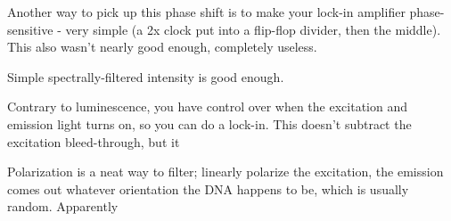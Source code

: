 \documentclass[paper.tex]{subfiles}
\begin{document}
Another way to pick up this phase shift is to make your lock-in amplifier phase-sensitive - very simple (a 2x clock put into a flip-flop divider, then the middle). This also wasn’t nearly good enough, completely useless. 

Simple spectrally-filtered intensity is good enough.

Contrary to luminescence, you have control over when the excitation and emission light turns on, so you can do a lock-in. This doesn’t subtract the excitation bleed-through, but it 

Polarization is a neat way to filter; linearly polarize the excitation, the emission comes out whatever orientation the DNA happens to be, which is usually random. Apparently
\end{document}
